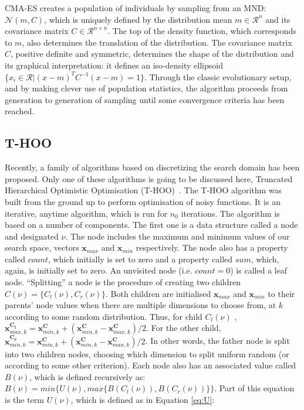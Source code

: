 \documentclass[conference]{IEEEtran}
\begin{document}
CMA-ES creates a population of individuals by sampling from an MND: $\mathcal{N}(m,C)$, which is uniquely defined by the distribution mean $m \in \mathcal{R}^{n}$ and its covariance matrix $C \in \mathcal{R}^{n \times n}$. The top of the density function, which corresponds to $m$, also determines the translation of the distribution. The covariance matrix $C$, positive definite and symmetric, determines the shape of the distribution and its graphical interpretation: it defines an iso-density ellipsoid $\{ x_i \in \mathcal{R} | (x - m)^T C^{-1} (x - m) = 1\}$. Through the classic evolutionary setup, and by making clever use of population statistics, the algorithm proceeds from generation to generation of sampling until some convergence criteria has been reached. 



\subsection{T-HOO}
Recently, a family of algorithms based on discretizing the search domain has been proposed. Only one of these algorithms is going to be discussed here, Truncated Hierarchical Optimistic Optimisation (T-HOO)~\cite{hoo2011}. The T-HOO algorithm was built from the ground up to perform optimisation of noisy functions. It is an iterative, anytime algorithm, which is run for $n_0$ iterations.  The algorithm is based on a number of components. The first one is a data structure called a node and designated $\nu$. The node includes the maximum and minimum values of our search space, vectors $\bm{x_{\mathit{max}}}$ and $\bm{x_{\mathit{min}}}$ respectively. The node also has a property called $\mathit{count}$, which initially is set to zero and a property called $\mathit{sum}$, which, again, is initially set to zero. An unvisited node (i.e. $\mathit{count}=0$) is called a leaf node.  ``Splitting'' a node is the procedure of creating two children $C(\nu) = \{C_l(\nu),C_r(\nu)\}$. Both children are initialised $\bm{x_{\mathit{max}}}$ and $\bm{x_{\mathit{min}}}$ to their parents' node values when there are multiple dimensions to choose from, at $k$ according to some random distribution. Thus, for child $C_l(\nu)$ ,   $\bm{x^{C_l}_{\mathit{max,k}}} =\bm{x^{C}_{\mathit{min,k}}} +  \left(\bm{x^{C}_{\mathit{min,k}}} - \bm{x^{C}_{\mathit{max,k}}}\right)/2 $. For the other child,  $\bm{x^{C_r}_{\mathit{min,k}}} = \bm{x^{C}_{\mathit{min,k}}} +  \left(\bm{x^{C}_{\mathit{min,k}}} - \bm{x^{C}_{\mathit{max,k}}}\right)/2 $. In other words, the father node is split into two children nodes, choosing which dimension to split uniform random (or according to some other criterion). Each node also has an associated value called $B(\nu)$, which is defined recursively as:  $B(\nu) = min \{U(\nu),max \{B(C_l(\nu)),B(C_r(\nu))\}\}$. Part of this equation is the term $U(\nu)$, which is defined as in Equation \ref{eq:U}:
\end{document}
